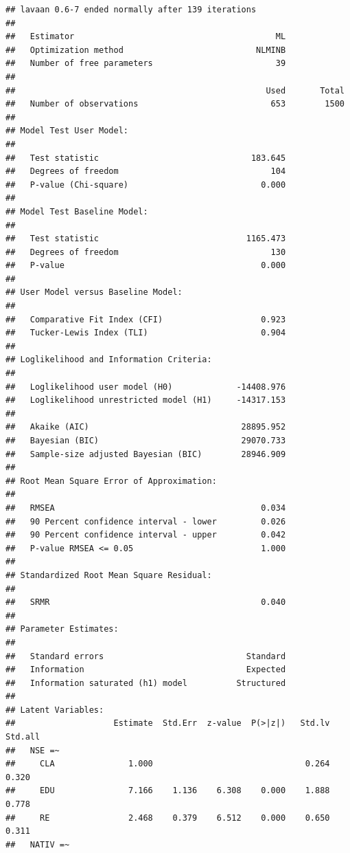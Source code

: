 \documentclass[
  12pt,
]{article}
\begin{document}
\begin{verbatim}
## lavaan 0.6-7 ended normally after 139 iterations
## 
##   Estimator                                         ML
##   Optimization method                           NLMINB
##   Number of free parameters                         39
##                                                       
##                                                   Used       Total
##   Number of observations                           653        1500
##                                                                   
## Model Test User Model:
##                                                       
##   Test statistic                               183.645
##   Degrees of freedom                               104
##   P-value (Chi-square)                           0.000
## 
## Model Test Baseline Model:
## 
##   Test statistic                              1165.473
##   Degrees of freedom                               130
##   P-value                                        0.000
## 
## User Model versus Baseline Model:
## 
##   Comparative Fit Index (CFI)                    0.923
##   Tucker-Lewis Index (TLI)                       0.904
## 
## Loglikelihood and Information Criteria:
## 
##   Loglikelihood user model (H0)             -14408.976
##   Loglikelihood unrestricted model (H1)     -14317.153
##                                                       
##   Akaike (AIC)                               28895.952
##   Bayesian (BIC)                             29070.733
##   Sample-size adjusted Bayesian (BIC)        28946.909
## 
## Root Mean Square Error of Approximation:
## 
##   RMSEA                                          0.034
##   90 Percent confidence interval - lower         0.026
##   90 Percent confidence interval - upper         0.042
##   P-value RMSEA <= 0.05                          1.000
## 
## Standardized Root Mean Square Residual:
## 
##   SRMR                                           0.040
## 
## Parameter Estimates:
## 
##   Standard errors                             Standard
##   Information                                 Expected
##   Information saturated (h1) model          Structured
## 
## Latent Variables:
##                    Estimate  Std.Err  z-value  P(>|z|)   Std.lv  Std.all
##   NSE =~                                                                
##     CLA               1.000                               0.264    0.320
##     EDU               7.166    1.136    6.308    0.000    1.888    0.778
##     RE                2.468    0.379    6.512    0.000    0.650    0.311
##   NATIV =~                                                              

\end{verbatim}
\end{document}

